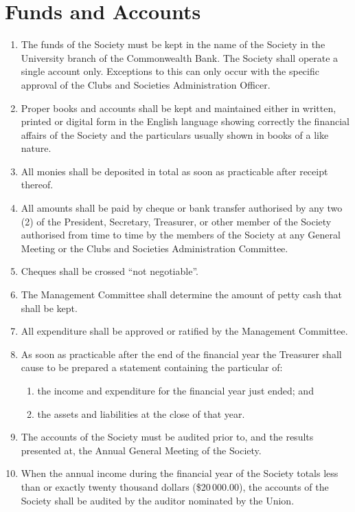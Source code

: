 \documentclass[a4paper]{article}
\begin{document}
\section{Funds and Accounts}
\begin{enumerate}
\item The funds of the Society must be kept in the name of the Society in the University branch of the Commonwealth Bank. The Society shall operate a single account only. Exceptions to this can only occur with the specific approval of the Clubs and Societies Administration Officer.
\item Proper books and accounts shall be kept and maintained either in written, printed or digital form in the English language showing correctly the financial affairs of the Society and the particulars usually shown in books of a like nature.
\item All monies shall be deposited in total as soon as practicable after receipt thereof.
\item All amounts shall be paid by cheque or bank transfer authorised by any two (2) of the President, Secretary, Treasurer, or other member of the Society authorised from time to time by the members of the Society at any General Meeting or the Clubs and Societies Administration Committee.
\item Cheques shall be crossed ``not negotiable''.
\item The Management Committee shall determine the amount of petty cash that shall be kept.
\item All expenditure shall be approved or ratified by the Management Committee.
\item As soon as practicable after the end of the financial year the Treasurer shall cause to be prepared a statement containing the particular of:
	\begin{enumerate}
	\item the income and expenditure for the financial year just ended; and
	\item the assets and liabilities at the close of that year.
	\end{enumerate}
\item The accounts of the Society must be audited prior to, and the results presented at, the Annual General Meeting of the Society.
\item When the annual income during the financial year of the Society totals less than or exactly twenty thousand dollars (\$20\,000.00), the accounts of the Society shall be audited by the auditor nominated by the Union.

\end{enumerate}
\end{document}
